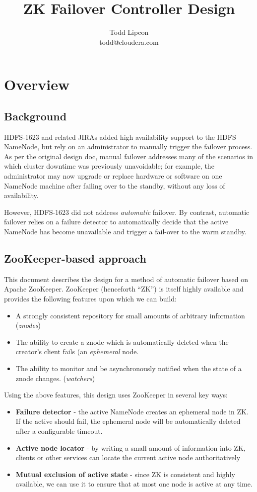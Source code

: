 \documentclass{article}
\title{ZK Failover Controller Design}
\author{Todd Lipcon\\todd@cloudera.com}
\begin{document}
\maketitle
\tableofcontents

\section{Overview}

\subsection{Background}
HDFS-1623 and related JIRAs added high availability support to the HDFS NameNode,
but rely on an administrator to manually trigger the failover process. As per
the original design doc, manual failover addresses many of the scenarios in which
cluster downtime was previously unavoidable; for example, the administrator
may now upgrade or replace hardware or software on one NameNode machine
after failing over to the standby, without any loss of availability.

However, HDFS-1623 did not address {\em automatic} failover. By contrast,
automatic failover relies on a failure detector to automatically decide that the
active NameNode has become unavailable and trigger a fail-over to the warm standby.

\subsection{ZooKeeper-based approach}

This document describes the design for a method of automatic failover based on
Apache ZooKeeper. ZooKeeper (henceforth ``ZK'') is itself highly available and
provides the following features upon which we can build:
\begin{itemize}
\item A strongly consistent repository for small amounts of arbitrary information ({\em znodes})
\item The ability to create a znode which is automatically deleted when the creator's client fails (an {\em ephemeral} node.
\item The ability to monitor and be asynchronously notified when the state of a znode changes. ({\em watchers})
\end{itemize}

Using the above features, this design uses ZooKeeper in several key ways:
\begin{itemize}
\item {\bf Failure detector} - the active NameNode creates an ephemeral node in ZK. If the active should fail, the ephemeral node will be automatically deleted after a configurable timeout.
\item {\bf Active node locator} - by writing a small amount of information into ZK, clients or other services can locate the current active node authoritatively
\item {\bf Mutual exclusion of active state} - since ZK is consistent and highly available, we can use it to ensure that at most one node is active at any time.
\end{itemize}
\end{document}
